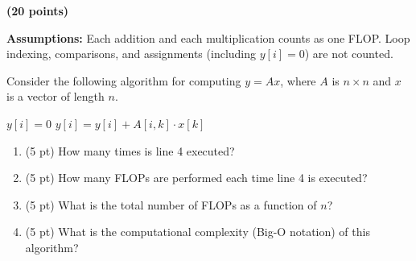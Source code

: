 \documentclass{ximera}
\begin{document}
\begin{exercise}
\textbf{(20 points)}

\textbf{Assumptions:} Each addition and each multiplication counts as one FLOP. Loop indexing, comparisons, and assignments (including $y[i]=0$) are not counted.

Consider the following algorithm for computing $y = Ax$, where $A$ is $n\times n$ and $x$ is a vector of length $n$.

\begin{algorithm}
\caption{Matrix-Vector Multiplication}
\begin{algorithmic}[1]
    \State $y[i] = 0$
        \State $y[i] = y[i] + A[i,k]\cdot x[k]$
    \EndFor
\EndFor
\end{algorithmic}
\end{algorithm}

\begin{enumerate}
    \item (5 pt) How many times is line 4 executed?
    \vfill
    \item (5 pt) How many FLOPs are performed each time line 4 is executed?
    \vfill
    \item (5 pt) What is the total number of FLOPs as a function of $n$?
    \vfill
    \item (5 pt) What is the computational complexity (Big-O notation) of this algorithm?
    \vfill
\end{enumerate}
\end{exercise}
\end{document}
